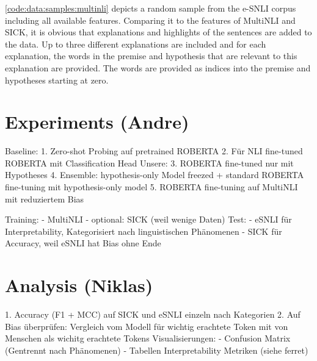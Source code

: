 \documentclass[12pt,a4paper]{article}
\begin{document}
\autoref{code:data:samples:multinli} depicts a random sample from the \acs{e-SNLI} corpus including all available features. Comparing it to the features of \acs{MultiNLI} and \acs{SICK}, it is obvious that explanations and highlights of the sentences are added to the data. Up to three different explanations are included and for each explanation, the words in the premise and hypothesis that are relevant to this explanation are provided. The words are provided as indices into the premise and hypotheses starting at zero.

\section{Experiments (Andre)}
Baseline:
1. Zero-shot Probing auf pretrained ROBERTA
2. Für NLI fine-tuned ROBERTA mit Classification Head
Unsere:
3. ROBERTA fine-tuned nur mit Hypotheses
4. Ensemble: hypothesis-only Model freezed + standard ROBERTA fine-tuning mit hypothesis-only model
5. ROBERTA fine-tuning auf MultiNLI mit reduziertem Bias

Training:
- MultiNLI
- optional: SICK (weil wenige Daten)
Test:
- eSNLI für Interpretability, Kategorisiert nach linguistischen Phänomenen
- SICK für Accuracy, weil eSNLI hat Bias ohne Ende

\section{Analysis (Niklas)}
1. Accuracy (F1 + MCC) auf SICK und eSNLI einzeln nach Kategorien
2. Auf Bias überprüfen: Vergleich vom Modell für wichtig erachtete Token mit von Menschen als wichitg erachtete Tokens
Visualisierungen:
- Confusion Matrix (Gentrennt nach Phänomenen)
- Tabellen Interpretability Metriken (siehe ferret)


\printbibliography
\end{document}
